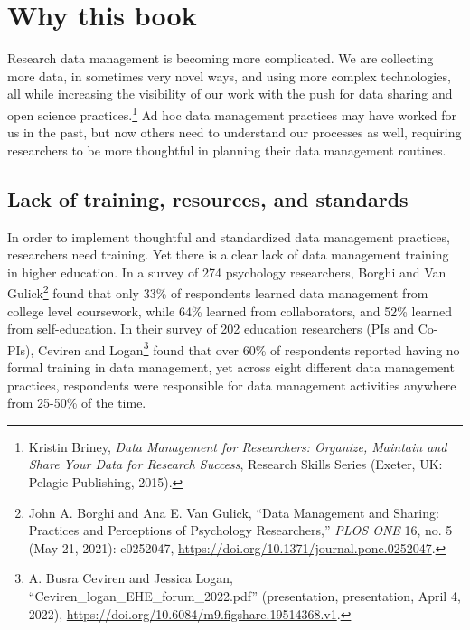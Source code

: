 \documentclass[
]{book}
\begin{document}
\hypertarget{why-this-book}{%
\section{Why this book}\label{why-this-book}}

Research data management is becoming more complicated. We are collecting more data, in sometimes very novel ways, and using more complex technologies, all while increasing the visibility of our work with the push for data sharing and open science practices.\footnote{Kristin Briney, \emph{Data Management for Researchers: Organize, Maintain and Share Your Data for Research Success}, Research Skills Series (Exeter, {UK}: Pelagic Publishing, 2015).} Ad hoc data management practices may have worked for us in the past, but now others need to understand our processes as well, requiring researchers to be more thoughtful in planning their data management routines.

\hypertarget{lack-of-training-resources-and-standards}{%
\subsection{Lack of training, resources, and standards}\label{lack-of-training-resources-and-standards}}

In order to implement thoughtful and standardized data management practices, researchers need training. Yet there is a clear lack of data management training in higher education. In a survey of 274 psychology researchers, Borghi and Van Gulick\footnote{John A. Borghi and Ana E. Van Gulick, {``Data Management and Sharing: Practices and Perceptions of Psychology Researchers,''} \emph{{PLOS} {ONE}} 16, no. 5 (May 21, 2021): e0252047, \url{https://doi.org/10.1371/journal.pone.0252047}.} found that only 33\% of respondents learned data management from college level coursework, while 64\% learned from collaborators, and 52\% learned from self-education. In their survey of 202 education researchers (PIs and Co-PIs), Ceviren and Logan\footnote{A. Busra Ceviren and Jessica Logan, {``Ceviren\_logan\_EHE\_forum\_2022.pdf''} (presentation, presentation, April 4, 2022), \url{https://doi.org/10.6084/m9.figshare.19514368.v1}.} found that over 60\% of respondents reported having no formal training in data management, yet across eight different data management practices, respondents were responsible for data management activities anywhere from 25-50\% of the time.
\end{document}
